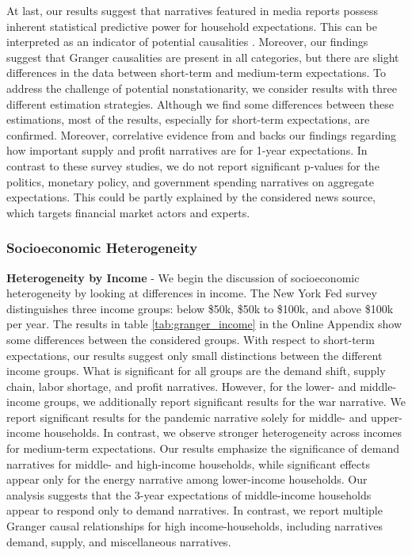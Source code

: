 At last,  our results suggest that narratives featured in media reports possess inherent statistical predictive power for household expectations. This can be interpreted as an indicator of potential causalities \cite{shojaie.2022}. Moreover, our findings suggest that Granger causalities are present in all categories, but there are slight differences in the data between short-term and medium-term expectations.  To address the challenge of potential nonstationarity, we consider results with three different estimation strategies. Although we find some differences between these estimations, most of the results, especially for short-term expectations, are confirmed. Moreover, correlative evidence from \cite{Andre.2023} and \cite{Stantcheva.2024} backs our findings regarding how important supply and profit narratives are for 1-year expectations. In contrast to these survey studies, we do not report significant p-values for the politics, monetary policy, and government spending narratives on aggregate expectations. This could be partly explained by the considered news source, which targets financial market actors and experts. 



\subsubsection{Socioeconomic Heterogeneity}

\textbf{Heterogeneity by Income} - We begin the discussion of socioeconomic heterogeneity by looking at differences in income. The New York Fed survey distinguishes three income groups: below \$50k, \$50k to \$100k, and above \$100k per year. The results in table \ref{tab:granger_income} in the Online Appendix show some differences between the considered groups. With respect to short-term expectations, our results suggest only small distinctions between the different income groups. What is significant for all groups are the demand shift, supply chain, labor shortage, and profit narratives. However, for the lower- and middle-income groups, we additionally report significant results for the war narrative. We report significant results for the pandemic narrative solely for middle- and upper-income households. In contrast, we observe stronger heterogeneity across incomes for medium-term expectations. Our results emphasize the significance of demand narratives for middle- and high-income households, while significant effects appear only for the energy narrative among lower-income households. Our analysis suggests that the 3-year expectations of middle-income households appear to respond only to demand narratives. In contrast, we report multiple Granger causal relationships for high income-households, including narratives demand, supply, and miscellaneous narratives.\\


